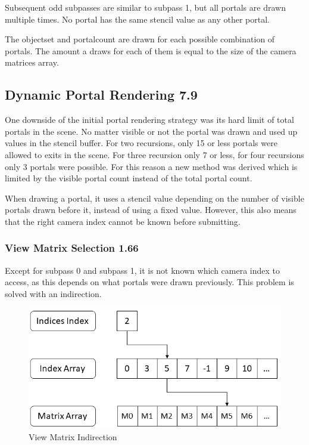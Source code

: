 Subsequent odd subpasses are similar to subpass 1, but all portals are drawn multiple times. No portal has the same stencil value as any other portal.

The \gls{objectset} and \gls{portalcount} are drawn for each possible combination of portals. The amount a draws for each of them is equal to the size of the camera matrices array.


\subsection{Dynamic Portal Rendering 7.9}
One downside of the initial portal rendering strategy was its hard limit of total portals in the scene. No matter visible or not the portal was drawn and used up values in the stencil buffer. For two recursions, only 15 or less portals were allowed to exits in the scene. For three recursion only 7 or less, for four recursions only 3 portals were possible. For this reason a new method was derived which is limited by the visible portal count instead of the total portal count. 

When drawing a portal, it uses a stencil value depending on the number of visible portals drawn before it, instead of using a fixed value. However, this also means that the right camera index cannot be known before submitting.


\subsubsection{View Matrix Selection 1.66}
\label{section:viewmatrixselection}
Except for subpass 0 and subpass 1, it is not known which camera index to access, as this depends on what portals were drawn previously. This problem is solved with an indirection.

\begin{figure}[h]
	\includegraphics[width=\linewidth]{images/viewmatrixindirection.png}
	\caption{View Matrix Indirection}
	\label{fig:viewmatrixindirection}
\end{figure}

